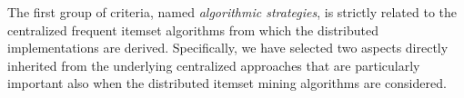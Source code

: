 
The first group of criteria, named \textit{algorithmic strategies}, is strictly related to the centralized frequent itemset algorithms from which the distributed implementations are derived. 
Specifically, we have selected two aspects directly inherited from the underlying centralized approaches that are particularly important also when the distributed itemset mining algorithms are considered.

 





